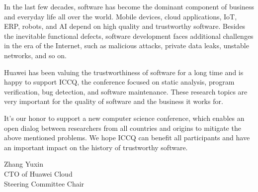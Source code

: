 \clearpage
{}

In the last few decades, software has become the dominant component of business and everyday life all over the world. Mobile devices, cloud applications, IoT, ERP, robots, and AI depend on high quality and trustworthy software. Besides the inevitable functional defects, software development faces additional challenges in the era of the Internet, such as malicious attacks, private data leaks, unstable networks, and so on.

Huawei has been valuing the trustworthiness of software for a long time and is happy to support ICCQ, the conference focused on static analysis, program verification, bug detection, and software maintenance. These research topics are very important for the quality of software and the business it works for.

It's our honor to support a new computer science conference, which enables an open dialog between researchers from all countries and origins to mitigate the above mentioned problems. We hope ICCQ can benefit all participants and have an important impact on the history of trustworthy software.

Zhang Yuxin \\
CTO of Huawei Cloud \\
Steering Committee Chair
